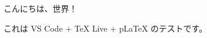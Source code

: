 \documentclass[uplatex]{jsarticle} %
\begin{document}
こんにちは、世界！

これは VS Code + TeX Live + pLaTeX のテストです。
\end{document}
